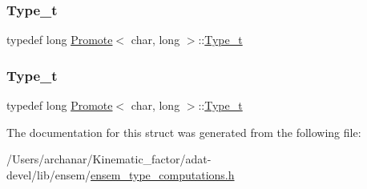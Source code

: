 \subsubsection{\texorpdfstring{Type\_t}{Type\_t}\hspace{0.1cm}{\footnotesize\ttfamily [2/3]}}
{\footnotesize\ttfamily typedef long \mbox{\hyperlink{structPromote}{Promote}}$<$ char, long $>$\+::\mbox{\hyperlink{structPromote_3_01char_00_01long_01_4_a1f06e3372fb9659a4cba391658ec5883}{Type\+\_\+t}}}

\mbox{\label{structPromote_3_01char_00_01long_01_4_a1f06e3372fb9659a4cba391658ec5883}} 
\subsubsection{\texorpdfstring{Type\_t}{Type\_t}\hspace{0.1cm}{\footnotesize\ttfamily [3/3]}}
{\footnotesize\ttfamily typedef long \mbox{\hyperlink{structPromote}{Promote}}$<$ char, long $>$\+::\mbox{\hyperlink{structPromote_3_01char_00_01long_01_4_a1f06e3372fb9659a4cba391658ec5883}{Type\+\_\+t}}}



The documentation for this struct was generated from the following file\+:\begin{DoxyCompactItemize}
\item 
/\+Users/archanar/\+Kinematic\+\_\+factor/adat-\/devel/lib/ensem/\mbox{\hyperlink{adat-devel_2lib_2ensem_2ensem__type__computations_8h}{ensem\+\_\+type\+\_\+computations.\+h}}\end{DoxyCompactItemize}
